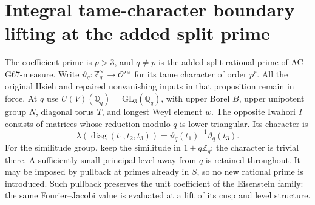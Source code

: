 \section{Integral tame-character boundary lifting at the added split prime}
\label{sec:cubic-hsieh-tame-type}

The coefficient prime is $p>3$, and $q\ne p$ is the added
split rational prime of AC-G67-measure.  Write
$\vartheta_q:\mathbb Z_q^\times\to\mathcal O'{}^\times$
for its tame character of order $p^r$.  All the original
Hsieh and repaired nonvanishing inputs in that proposition
remain in force.  At $q$ use
$U(V)(\mathbb Q_q)=\mathrm{GL}_3(\mathbb Q_q)$, with upper
Borel $B$, upper unipotent group $N$, diagonal torus $T$, and
longest Weyl element $w$.  The opposite Iwahori $I^-$ consists
of matrices whose reduction modulo $q$ is lower triangular.
Its character is
\[
 \lambda(\operatorname{diag}(t_1,t_2,t_3))
       =\vartheta_q(t_1)^{-1}\vartheta_q(t_3).
                                                        \tag{G67.2}
\]
For the similitude group, keep the similitude in
$1+q\mathbb Z_q$; the character is trivial there.  A sufficiently
small principal level away from $q$ is retained throughout.
It may be imposed by pullback at primes already in $S$, so
no new rational prime is introduced.  Such pullback preserves
the unit coefficient of the Eisenstein family: the same
Fourier--Jacobi value is evaluated at a lift of its cusp and
level structure.

